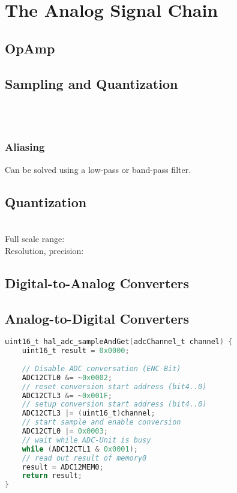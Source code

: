 \section{The Analog Signal Chain }
\subsection{OpAmp }
\subsection{Sampling and Quantization }
\\
\\

\subsubsection{Aliasing }

Can be solved using a low-pass or band-pass filter.

\subsection{Quantization}
\\
Full scale range: \\
Resolution, precision: \\

\subsection{Digital-to-Analog Converters }
\subsection{Analog-to-Digital Converters }
\begin{lstlisting}[language=C]
uint16_t hal_adc_sampleAndGet(adcChannel_t channel) {
	uint16_t result = 0x0000;
	
	// Disable ADC conversation (ENC-Bit)
	ADC12CTL0 &= ~0x0002;
	// reset conversion start address (bit4..0)
	ADC12CTL3 &= ~0x001F;
	// setup conversion start address (bit4..0)
	ADC12CTL3 |= (uint16_t)channel;
	// start sample and enable conversion
	ADC12CTL0 |= 0x0003;
	// wait while ADC-Unit is busy
	while (ADC12CTL1 & 0x0001);
	// read out result of memory0
	result = ADC12MEM0;  
	return result;
}
\end{lstlisting}